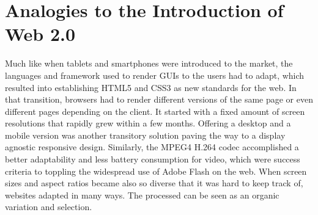 \section{Analogies to the Introduction of Web 2.0}

%
%


Much like when tablets and smartphones were introduced to the market, the languages and framework used to render GUIs to the users had to adapt, which resulted into establishing HTML5 and CSS3 as new standards for the web. In that transition, %
browsers had to render different versions of the same page or even different pages depending on the client. It started with a fixed amount of screen resolutions that rapidly grew within a few months. Offering a desktop and a mobile version was another transitory solution paving the way to %
a display agnostic responsive design. Similarly, the MPEG4 H.264 codec accomplished a better adaptability and less battery consumption for video, which were success criteria to toppling the widespread use of Adobe Flash on the web. %
When screen sizes and aspect ratios became also so diverse that it was hard to keep track of, websites %
adapted in many ways. %
The processed can be seen as an organic variation and selection.

